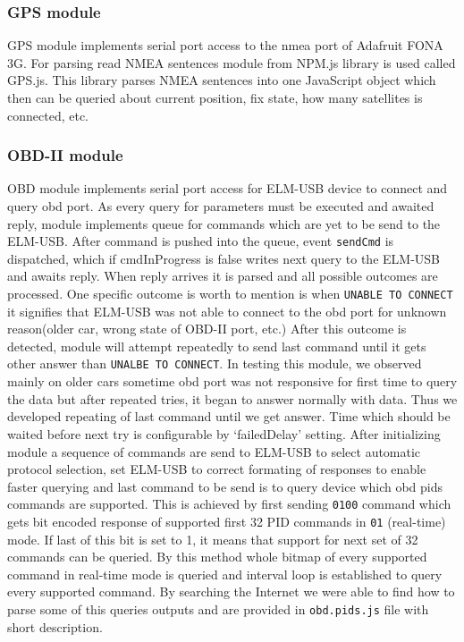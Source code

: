 \subsubsection{GPS module} %
\label{ssub:gps_module}
GPS module implements serial port access to the nmea port of Adafruit FONA 3G. For parsing read NMEA sentences module from NPM.js library is used called GPS.js. This library parses NMEA sentences into one JavaScript object which then can be queried about current position, fix state, how many satellites is connected, etc.
\subsubsection{OBD-II module} %
\label{ssub:obd_ii_module}
OBD module implements serial port access for ELM-USB device to connect and query \gls{obd} port. As every query for parameters must be executed and awaited reply, module implements queue for commands which are yet to be send to the ELM-USB. After command is pushed into the queue, event \verb|sendCmd| is dispatched, which if cmdInProgress is false writes next query to the ELM-USB and awaits reply. When reply arrives it is parsed and all possible outcomes are processed. One specific outcome is worth to mention is when \verb|UNABLE TO CONNECT| it signifies that ELM-USB was not able to connect to the \gls{obd} port for unknown reason(older car, wrong state of OBD-II port, etc.) After this outcome is detected, module will attempt repeatedly to send last command until it gets other answer than \verb|UNALBE TO CONNECT|. In testing this module, we observed mainly on older cars sometime \gls{obd} port was not responsive for first time to query the data but after repeated tries, it began to answer normally with data. Thus we developed repeating of last command until we get answer. Time which should be waited before next try is configurable by `failedDelay' setting. After initializing module a sequence of commands are send to ELM-USB to select automatic protocol selection, set ELM-USB to correct formating of responses to enable faster querying and last command to be send is to query device which \gls{obd} \gls{pids} commands are supported. This is achieved by first sending \verb|0100| command which gets bit encoded response of supported first 32 PID commands in \verb|01| (real-time) mode. If last of this bit is set to 1, it means that support for next set of 32 commands can be queried. By this method whole bitmap of every supported command in real-time mode is queried and interval loop is established to query every supported command. By searching the Internet we were able to find how to parse some of this queries outputs and are provided in \verb|obd.pids.js| file with short description.
